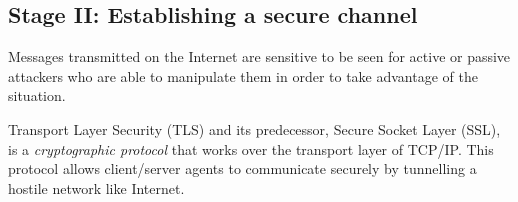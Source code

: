 \subsection{Stage II: Establishing a secure channel}
\label{sec:secureChannel}
Messages transmitted on the Internet are sensitive to be seen for
active or passive attackers who are able to manipulate them in order
to take advantage of the situation.

Transport Layer Security (TLS) and its predecessor, Secure Socket
Layer (SSL), is a \emph{cryptographic protocol} that works over the transport 
layer of TCP/IP. This protocol allows client/server agents to communicate 
securely by tunnelling a hostile network like Internet. 


